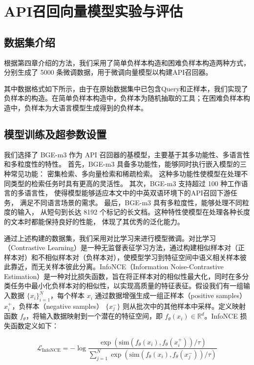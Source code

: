 \section{API召回向量模型实验与评估}


\subsection{数据集介绍}

根据第四章介绍的方法，我们采用了简单负样本构造和困难负样本构造两种方式，分别生成了 5000 条微调数据，用于微调向量模型以构建API召回器。

其中数据格式如下所示，由于在原始数据集中已包含Query和正样本，我们实现了负样本的构造。在简单负样本构造中，负样本为随机抽取的工具；在困难负样本构造中，负样本为大语言模型生成得到的负样本。

\subsection{模型训练及超参数设置}

我们选择了 BGE-m3\cite{chen2024bge} 作为 API 召回器的基模型，主要基于其多功能性、多语言性和多粒度性的特性。
首先，BGE-m3 具备多功能性，能够同时执行嵌入模型的三种常见功能：
密集检索、多向量检索和稀疏检索。
这种多功能性使模型在处理不同类型的检索任务时具有更高的灵活性。
其次，BGE-m3 支持超过 100 种工作语言的多语言性，
使得模型能够适应本文中的中英双语环境下的API召回下游任务，
满足不同语言场景的需求。
最后，BGE-m3 具有多粒度性，能够处理不同粒度的输入，
从短句到长达 8192 个标记的长文档。这种特性使模型在处理各种长度的文本时都能保持良好的性能，
体现了其优秀的泛化能力。

通过上述构建的数据集，我们采用对比学习来进行模型微调。对比学习（Contrastive Learning）是一种无监督表征学习方法，通过构建相似样本对（正样本对）和不相似样本对（负样本对），使模型学习到特征空间中语义相关样本彼此靠近，而无关样本彼此分离。InfoNCE（Information Noise-Contrastive Estimation）是一种对比损失函数，旨在将正样本对的相似性最大化，同时在多分类任务中最小化负样本对的相似性，以实现高质量的特征表征。假设我们有一组输入数据 $\{x_i\}_{i=1}^N$，每个样本 $x_i$ 通过数据增强生成一组正样本（positive samples）$x_i^+$，负样本（negative samples） $\{x_j^-\}$ 则从批次中的其他样本中采样。定义映射函数 $f_{\theta}$，将输入数据映射到一个潜在的特征空间，即 $f_{\theta}(x_i) \in \mathbb{R}^d$。InfoNCE 损失函数定义如下：

\begin{equation}
\mathcal{L}_{\text{InfoNCE}} = -\log \frac{\exp(\text{sim}(f_{\theta}(x_i), f_{\theta}(x_i^+))/\tau)}{\sum_{j=1}^N \exp(\text{sim}(f_{\theta}(x_i), f_{\theta}(x_j^-))/\tau)}
\end{equation}

